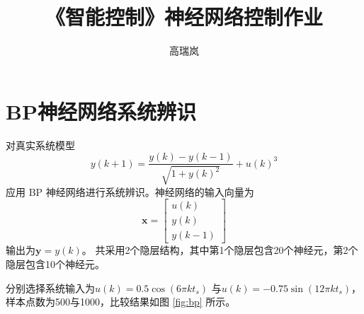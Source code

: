 \documentclass{article}
\title{《智能控制》神经网络控制作业}
\author{高瑞岚\quad 3190103249}
\date{}
\begin{document}
\maketitle
\tableofcontents

\section{BP神经网络系统辨识}
对真实系统模型
\begin{equation*}
    y(k+1) = \frac{y(k)-y(k-1)}{\sqrt{1+{y(k)}^2}}
    + {u(k)}^3
\end{equation*}
应用 BP 神经网络进行系统辨识。神经网络的输入向量为
\begin{equation*}
\mathbf{x} = 
\begin{bmatrix}
u(k) \\ y(k) \\ y(k-1)
\end{bmatrix}
\end{equation*}
输出为$ \mathbf{y} = y(k) $。
共采用2个隐层结构，其中第1个隐层包含20个神经元，第2个隐层包含10个神经元。

分别选择系统输入为$ u(k) = 0.5 \cos(6\pi k t_s) $
与$ u(k) = -0.75 \sin(12\pi k t_s) $，
样本点数为500与1000，比较结果如图 \ref{fig:bp} 所示。
\end{document}

